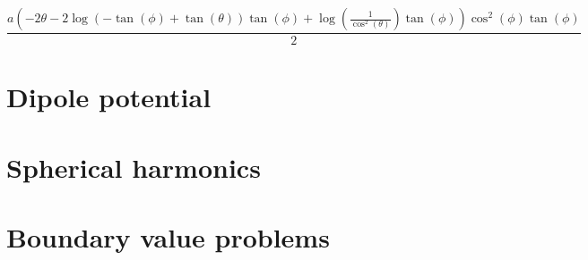 \documentclass[
  a4paper,
  DIV=11,
  numbers=noendperiod]{scrreprt}
\begin{document}
\begin{equation}\frac{a \left(- 2 \theta - 2 \log{\left(- \tan{\left(\phi \right)} + \tan{\left(\theta \right)} \right)} \tan{\left(\phi \right)} + \log{\left(\frac{1}{\cos^{2}{\left(\theta \right)}} \right)} \tan{\left(\phi \right)}\right) \cos^{2}{\left(\phi \right)} \tan{\left(\phi \right)}}{2}\end{equation}

\part{Dipole potential}

\part{Spherical harmonics}

\part{Boundary value problems}
\end{document}
